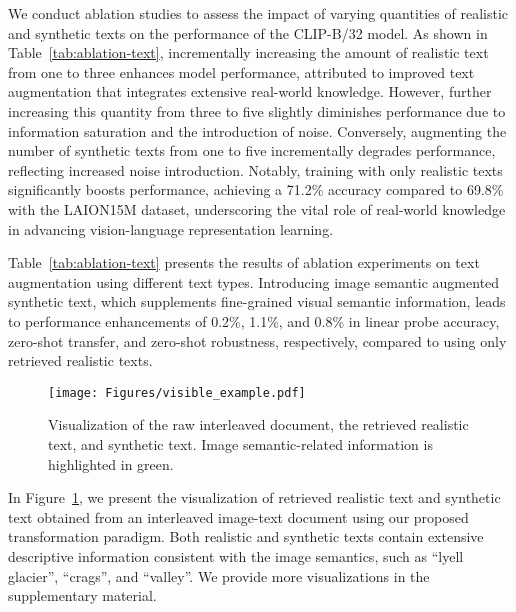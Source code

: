  We conduct ablation studies to assess the impact of varying quantities of realistic and synthetic texts on the performance of the CLIP-B/32 model. As shown in Table~\ref{tab:ablation-text}, incrementally increasing the amount of realistic text from one to three enhances model performance, attributed to improved text augmentation that integrates extensive real-world knowledge. However, further increasing this quantity from three to five slightly diminishes performance due to information saturation and the introduction of noise. Conversely, augmenting the number of synthetic texts from one to five incrementally degrades performance, reflecting increased noise introduction. Notably, training with only realistic texts significantly boosts performance, achieving a 71.2\% accuracy compared to 69.8\% with the LAION15M dataset, underscoring the vital role of real-world knowledge in advancing vision-language representation learning.



 Table~\ref{tab:ablation-text} presents the results of ablation experiments on text augmentation using different text types. Introducing image semantic augmented synthetic text, which supplements fine-grained visual semantic information, leads to performance enhancements of 0.2\%, 1.1\%, and 0.8\% in linear probe accuracy, zero-shot transfer, and zero-shot robustness, respectively, compared to using only retrieved realistic texts.


\begin{figure}[!t]
\centering
\texttt{[image: Figures/visible\_example.pdf]}
\vspace{-5mm}
\caption{Visualization of the raw interleaved document, the retrieved realistic text, and synthetic text. Image semantic-related information is highlighted in \textcolor{fig2_green}{green}.}
\label{fig:visualization_example}
\vspace{-2mm}
\end{figure}

 In Figure~\ref{fig:visualization_example}, we present the visualization of retrieved realistic text and synthetic text obtained from an interleaved image-text document using our proposed transformation paradigm. Both realistic and synthetic texts contain extensive descriptive information consistent with the image semantics, such as ``lyell glacier'', ``crags'', and ``valley''. We provide more visualizations in the supplementary material.





